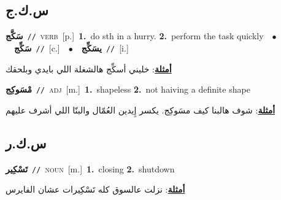 \documentclass[10pt,a4paper,twoside]{article} %
\begin{document}
\begin{multicols}{2}
\vspace{-3mm}
\subsection*{\color{blue}\foreignlanguage{arabic}{س.ك.ج}\color{blue}{ (ntws)}} 

{\setlength\topsep{0pt}\textbf{\foreignlanguage{arabic}{سَكَّج}}\ {\color{gray}\texttt{//}\color{black}}\ \textsc{verb}\ [p.]\ \textbf{1.}~do sth in a hurry.  \textbf{2.}~perform the task quickly\ \ $\bullet$\ \ \setlength\topsep{0pt}\textbf{\foreignlanguage{arabic}{سَكِّج}}\ {\color{gray}\texttt{//}\color{black}}\ [c.]\ \ $\bullet$\ \ \setlength\topsep{0pt}\textbf{\foreignlanguage{arabic}{يسَكِّج}}\ {\color{gray}\texttt{//}\color{black}}\ [i.]\  \begin{flushright}\color{gray}\foreignlanguage{arabic}{\textbf{\underline{\foreignlanguage{arabic}{أمثلة}}}: خليني أسكِّج هالشغلة اللي بايدي وبلحقك}\end{flushright}\color{black}} \vspace{2mm}

{\setlength\topsep{0pt}\textbf{\foreignlanguage{arabic}{مْسَوكِج}}\ {\color{gray}\texttt{//}\color{black}}\ \textsc{adj}\ [m.]\ \textbf{1.}~shapeless  \textbf{2.}~not haiving a definite shape\  \begin{flushright}\color{gray}\foreignlanguage{arabic}{\textbf{\underline{\foreignlanguage{arabic}{أمثلة}}}: شوف هالبنا كيف مسَوكِج. يكسر إِيدين العُمّال والبنّا اللي أشرف عليهم}\end{flushright}\color{black}} \vspace{2mm}

\vspace{-3mm}
\subsection*{\color{blue}\foreignlanguage{arabic}{س.ك.ر}\color{blue}{}} 

{\setlength\topsep{0pt}\textbf{\foreignlanguage{arabic}{تَسْكِير}}\ {\color{gray}\texttt{//}\color{black}}\ \textsc{noun}\ [m.]\ \textbf{1.}~closing  \textbf{2.}~shutdown\  \begin{flushright}\color{gray}\foreignlanguage{arabic}{\textbf{\underline{\foreignlanguage{arabic}{أمثلة}}}: نزلت عالسوق كله تَسْكِيرات عشان الفايرس}\end{flushright}\color{black}} \vspace{2mm}


\end{multicols}
\end{document}
